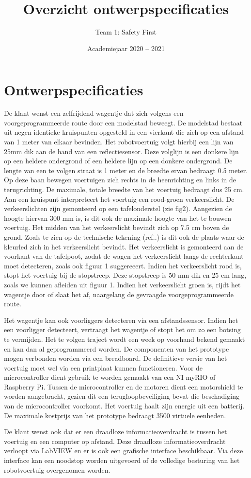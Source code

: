 \documentclass[a4paper,kulak]{kulakarticle} %
\date{Academiejaar 2020 -- 2021}
\title{Overzicht ontwerpspecificaties}
\author{Team 1: Safety First}
\begin{document}
\maketitle

\section{Ontwerpspecificaties}

De klant wenst een zelfrijdend wagentje dat zich volgens een voorgeprogrammeerde route door een modelstad beweegt. De modelstad bestaat uit negen identieke kruispunten opgesteld in een vierkant die zich op een afstand van 1 meter van elkaar bevinden. 
Het robotvoertuig volgt hierbij een lijn van 25mm dik aan de hand van een reflectiesensor. Deze volglijn is een donkere lijn op een heldere ondergrond of een heldere lijn op een donkere ondergrond. De lengte van een te volgen straat is 1 meter en de breedte ervan bedraagt 0.5 meter. Op deze baan bewegen voertuigen zich rechts in de heenrichting en links in de terugrichting. De maximale, totale breedte van het voertuig bedraagt dus 25 cm. Aan een kruispunt interpreteert het voertuig een rood-groen verkeerslicht. De verkeerslichten zijn gemonteerd op een tafelonderstel (zie fig2). Aangezien de hoogte hiervan 300 mm is, is dit ook de maximale hoogte van het te bouwen voertuig. Het midden van het verkeerslicht bevindt zich op 7.5 cm boven de grond. Zoals te zien op de technische tekening (ref..) is dit ook de plaats waar de kleurled zich in het verkeerslicht bevindt. Het verkeerslicht is gemonteerd aan de voorkant van de tafelpoot, zodat de wagen het verkeerslicht langs de rechterkant moet detecteren, zoals ook figuur 1 suggereeert.  Indien het verkeerslicht rood is, stopt het voertuig bij de stopstreep. Deze stopstreep is 50 mm dik en 25 cm lang, zoals we kunnen afleiden uit figuur 1. Indien het verkeerslicht groen is, rijdt het wagentje door of slaat het af, naargelang de gevraagde voorgeprogrammeerde route.

Het wagentje kan ook voorliggers detecteren via een afstandssensor. Indien het een voorligger detecteert, vertraagt het wagentje of stopt het om zo een botsing te vermijden.
Het te volgen traject wordt een week op voorhand bekend gemaakt en kan dan al geprogrammeerd worden.
De componenten van het prototype mogen verbonden worden via een breadboard. De definitieve versie van het voertuig moet wel via een printplaat kunnen functioneren. Voor de microcontroller dient gebruik te worden gemaakt van een NI myRIO of Raspberry Pi. Tussen de microcontroller en de motoren dient een motorshield te worden aangebracht, gezien dit een terugloopbeveiliging bevat die beschadiging van de microcontroller voorkomt. Het voertuig haalt zijn energie uit een batterij. De maximale kostprijs van het prototype bedraagt 3500 virtuele eenheden.

De klant wenst ook dat er een draadloze informatieoverdracht is tussen het voertuig en een computer op afstand. Deze draadloze informatieoverdracht verloopt via LabVIEW en er is ook een grafische interface beschikbaar. Via deze interface kan een noodstop worden uitgevoerd of de volledige besturing van het robotvoertuig overgenomen worden.
\end{document}
